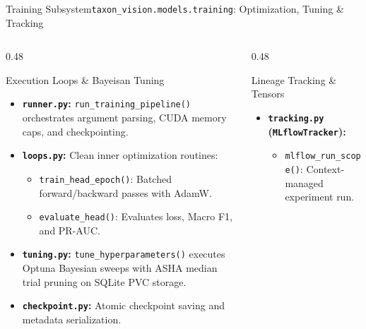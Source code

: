 \begin{frame}{Training Subsystem}{\texttt{taxon\_vision.models.training}: Optimization, Tuning \& Tracking}
    \begin{columns}[T]
        \begin{column}{0.48\textwidth}
            \begin{block}{Execution Loops \& Bayeisan Tuning}
                \begin{itemize}\scriptsize
                    \item \textbf{\texttt{runner.py}:} \texttt{run\_training\_pipeline()} orchestrates argument parsing, CUDA memory caps, and checkpointing.
                    \item \textbf{\texttt{loops.py}:} Clean inner optimization routines:
                        \begin{itemize}\tiny
                            \item \texttt{train\_head\_epoch()}: Batched forward/backward passes with AdamW.
                            \item \texttt{evaluate\_head()}: Evaluates loss, Macro F1, and PR-AUC.
                        \end{itemize}
                    \item \textbf{\texttt{tuning.py}:} \texttt{tune\_hyperparameters()} executes Optuna Bayesian sweeps with ASHA median trial pruning on SQLite PVC storage.
                    \item \textbf{\texttt{checkpoint.py}:} Atomic checkpoint saving and metadata serialization.
                \end{itemize}
            \end{block}
        \end{column}
        \begin{column}{0.48\textwidth}
            \begin{block}{Lineage Tracking \& Tensors}
                \begin{itemize}\scriptsize
                    \item \textbf{\texttt{tracking.py} (\texttt{MLflowTracker}):}
                        \begin{itemize}\tiny
                            \item \texttt{mlflow\_run\_scope()}: Context-managed experiment run.

\end{itemize}
\end{itemize}
\end{block}
\end{column}
\end{columns}
\end{frame}
